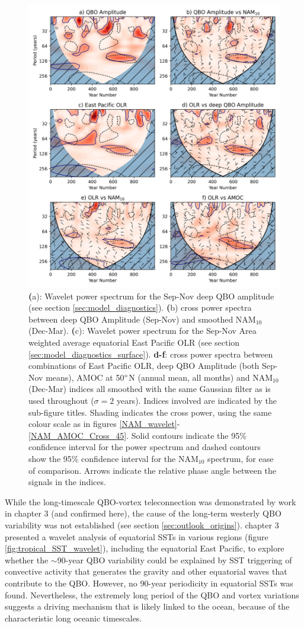 \begin{figure}[h!]
\begin{center}
\noindent\includegraphics[width = 0.7\linewidth]{Figures/Figures-surface/OLR_wavelet.png}
\caption[Power spectra for the QBO amplitude and associated surface metrics]{\textbf(a): Wavelet power spectrum for the Sep-Nov deep QBO amplitude (see section \ref{sec:model_diagnostics}). \textbf(b) cross power spectra between deep QBO Amplitude (Sep-Nov) and smoothed NAM$_{10}$ (Dec-Mar). \textbf(c): Wavelet power spectrum for the Sep-Nov  Area weighted average equatorial East Pacific OLR (see section \ref{sec:model_diagnostics_surface}). \textbf{d-f}: cross power spectra between combinations of East Pacific OLR, deep QBO Amplitude (both Sep-Nov means), AMOC at 50$\degree$N (annual mean, all months) and NAM$_{10}$ (Dec-Mar) indices all smoothed with the same Gaussian filter as is used throughout ($\sigma = 2$ years). Indices involved are indicated by the sub-figure titles. Shading indicates the cross power, using the same colour scale as in figures \ref{NAM_wavelet}-\ref{NAM_AMOC_Cross_45}. Solid contours indicate the 95\% confidence interval for the power spectrum and dashed contours show the 95\% confidence interval for the NAM$_{10}$ spectrum, for ease of comparison. Arrows  indicate the relative phase angle between the signals in the indices.}
\label{OLR_wavelet}
\end{center}
\end{figure}

While the long-timescale QBO-vortex teleconnection was demonstrated by work in chapter 3 (and confirmed here), the cause of the long-term westerly QBO variability was not established (see section \ref{sec:outlook_origins}). chapter 3 presented a wavelet analysis of equatorial SSTs in various regions (figure \ref{fig:tropical_SST_wavelet}), including the equatorial East Pacific, to explore whether the $\sim$90-year QBO variability could be explained by SST triggering of convective activity that generates the gravity and other equatorial waves that contribute to the QBO. However, no 90-year periodicity in equatorial SSTs was found. Nevertheless, the extremely long period of the QBO and vortex variations suggests a driving mechanism that is likely linked to the ocean, because of the characteristic long oceanic timescales.

